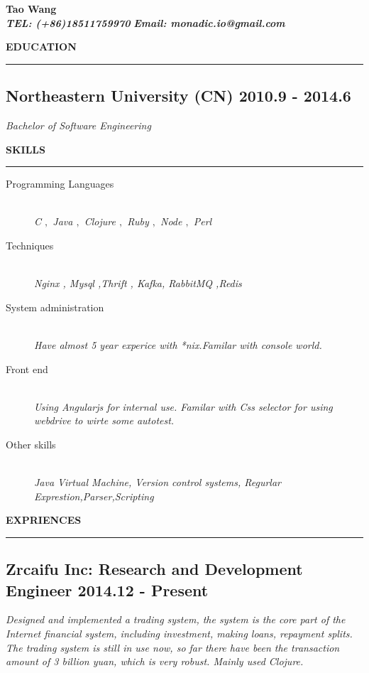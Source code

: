 \documentclass[12pt, a4paper]{article}
\newcommand{\datedsubsection}[2]{%
 \subsection[#1]{#1 \hfill #2}%
}
\renewcommand{\datedsubsection}[2]{ %
 \subsection[#1]{#1 \hfill #2}%
}
\begin{document}
\noindent\textbf{\Large Tao Wang}
\\[9pt]
{
\textbf{\it TEL: (+86)18511759970}\quad
\textbf{\it Email: monadic.io@gmail.com}}


\vspace{3ex}
\par\hbox{\textbf{\large EDUCATION}}\kern3pt\hrule height 1pt\kern-15pt
\datedsubsection{Northeastern University (CN)}{2010.9 - 2014.6}
{\it Bachelor of Software Engineering}\\

\vspace{0.5ex}
\par\hbox{\textbf {\large SKILLS}}\kern3pt\hrule height 1pt\kern3pt

\begin{description}
  \item[Programming Languages] \hfill \\
  \it{
   C $,$ Java $,$ Clojure $,$ Ruby $,$ Node $,$ Perl
   }
  \item[Techniques] \hfill \\
  \it{
   Nginx , Mysql ,Thrift , Kafka, RabbitMQ ,Redis
   }
  \item[System administration] \hfill \\
  \it{
   Have almost 5 year experice with *nix.Familar with console world.}
  \item[Front end] \hfill \\
  \it{
  Using Angularjs for internal use. Familar with Css selector for using webdrive to wirte some autotest. }
  \item[Other skills] \hfill \\
 \it{ Java Virtual Machine, Version control systems, Regurlar Exprestion,Parser,Scripting }
 \end{description}

\vspace{0.5ex}
\par\hbox{\textbf {\large EXPRIENCES}}\kern3pt\hrule height 1pt\kern-15pt

\datedsubsection{\sffamily Zrcaifu Inc:  Research and Development Engineer}{2014.12 - Present}
{\it Designed and implemented a trading system,  the system is the core part of the Internet financial system, including investment, making loans, repayment splits. The trading system is still in use now, so far there have been the transaction amount of 3 billion yuan, which is very robust. Mainly used Clojure.}
\\
 
\end{document}
